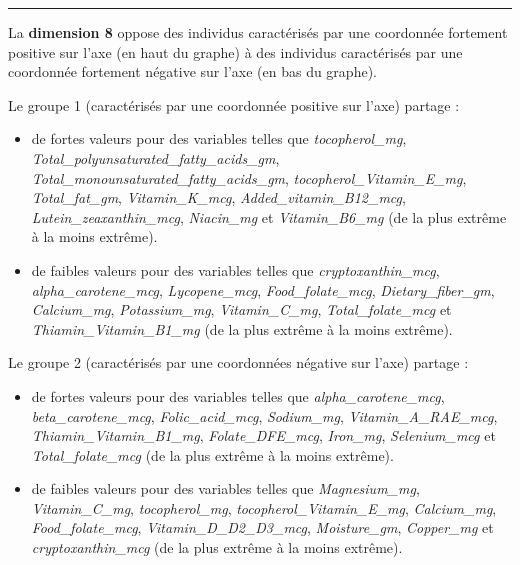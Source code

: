\documentclass[]{article}
\providecommand{\tightlist}{%
  \setlength{\itemsep}{0pt}\setlength{\parskip}{0pt}}
\begin{document}
\begin{center}\rule{0.5\linewidth}{\linethickness}\end{center}

La \textbf{dimension 8} oppose des individus caractérisés par une
coordonnée fortement positive sur l'axe (en haut du graphe) à des
individus caractérisés par une coordonnée fortement négative sur l'axe
(en bas du graphe).

Le groupe 1 (caractérisés par une coordonnée positive sur l'axe) partage
:

\begin{itemize}
\tightlist
\item
  de fortes valeurs pour des variables telles que \emph{tocopherol\_mg},
  \emph{Total\_polyunsaturated\_fatty\_acids\_gm},
  \emph{Total\_monounsaturated\_fatty\_acids\_gm},
  \emph{tocopherol\_Vitamin\_E\_mg}, \emph{Total\_fat\_gm},
  \emph{Vitamin\_K\_mcg}, \emph{Added\_vitamin\_B12\_mcg},
  \emph{Lutein\_zeaxanthin\_mcg}, \emph{Niacin\_mg} et
  \emph{Vitamin\_B6\_mg} (de la plus extrême à la moins extrême).
\item
  de faibles valeurs pour des variables telles que
  \emph{cryptoxanthin\_mcg}, \emph{alpha\_carotene\_mcg},
  \emph{Lycopene\_mcg}, \emph{Food\_folate\_mcg},
  \emph{Dietary\_fiber\_gm}, \emph{Calcium\_mg}, \emph{Potassium\_mg},
  \emph{Vitamin\_C\_mg}, \emph{Total\_folate\_mcg} et
  \emph{Thiamin\_Vitamin\_B1\_mg} (de la plus extrême à la moins
  extrême).
\end{itemize}

Le groupe 2 (caractérisés par une coordonnées négative sur l'axe)
partage :

\begin{itemize}
\tightlist
\item
  de fortes valeurs pour des variables telles que
  \emph{alpha\_carotene\_mcg}, \emph{beta\_carotene\_mcg},
  \emph{Folic\_acid\_mcg}, \emph{Sodium\_mg},
  \emph{Vitamin\_A\_RAE\_mcg}, \emph{Thiamin\_Vitamin\_B1\_mg},
  \emph{Folate\_DFE\_mcg}, \emph{Iron\_mg}, \emph{Selenium\_mcg} et
  \emph{Total\_folate\_mcg} (de la plus extrême à la moins extrême).
\item
  de faibles valeurs pour des variables telles que \emph{Magnesium\_mg},
  \emph{Vitamin\_C\_mg}, \emph{tocopherol\_mg},
  \emph{tocopherol\_Vitamin\_E\_mg}, \emph{Calcium\_mg},
  \emph{Food\_folate\_mcg}, \emph{Vitamin\_D\_D2\_D3\_mcg},
  \emph{Moisture\_gm}, \emph{Copper\_mg} et \emph{cryptoxanthin\_mcg}
  (de la plus extrême à la moins extrême).
\end{itemize}
\end{document}
